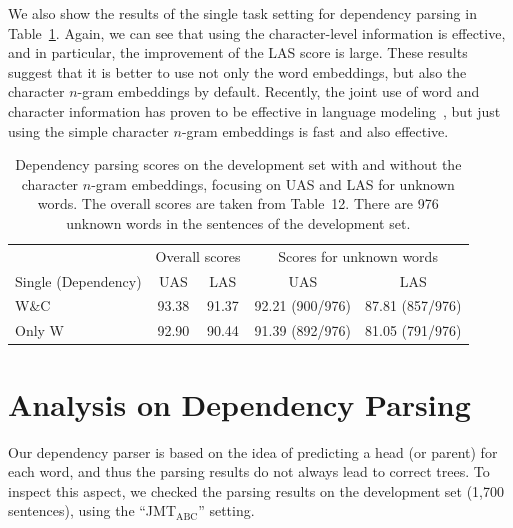 \documentclass[11pt,a4paper]{article}
\begin{document}
We also show the results of the single task setting for dependency parsing in Table~\ref{tb:dep_unk}.
Again, we can see that using the character-level information is effective, and in particular, the improvement of the LAS score is large.
These results suggest that it is better to use not only the word embeddings, but also the character $n$-gram embeddings by default.
Recently, the joint use of word and character information has proven to be effective in language modeling~\citep{miyamoto2016char}, but just using the simple character $n$-gram embeddings is fast and also effective.

\begin{table}[t]
  \begin{center}
	\begin{tabular}{l|cc|cc}
                        & \multicolumn{2}{|c|}{Overall scores} & \multicolumn{2}{|c}{Scores for unknown words} \\
  	Single (Dependency) & UAS   & LAS   & UAS             & LAS \\ \hline
    W\&C                & 93.38 & 91.37 & 92.21 (900/976) & 87.81 (857/976) \\ \hline
    Only W              & 92.90 & 90.44 & 91.39 (892/976) & 81.05 (791/976) \\ \hline
  \end{tabular}
    \caption{Dependency parsing scores on the development set with and without the character $n$-gram embeddings, focusing on UAS and LAS for unknown words.
    	     The overall scores are taken from Table~12.
             There are 976 unknown words in the sentences of the development set.}
    \label{tb:dep_unk}
  \end{center}
\end{table}


\section{Analysis on Dependency Parsing}
\label{sec:dep_analysis}

Our dependency parser is based on the idea of predicting a head (or parent) for each word, and thus the parsing results do not always lead to correct trees.
To inspect this aspect, we checked the parsing results on the development set (1,700 sentences), using the ``JMT$_{\mathrm{ABC}}$'' setting.
\end{document}
